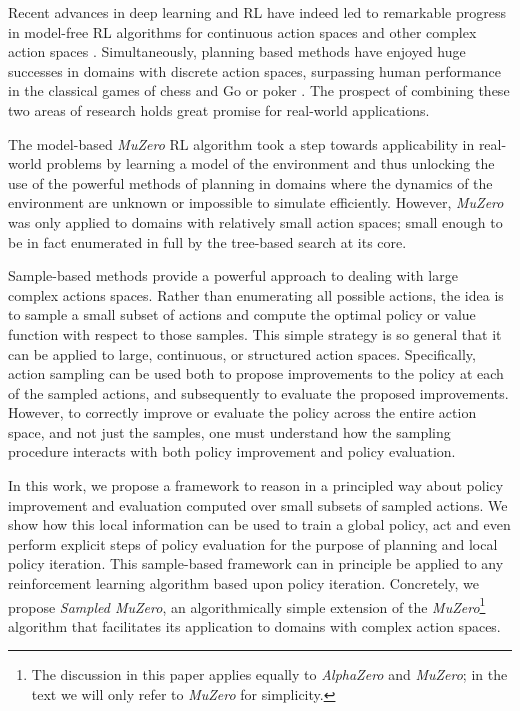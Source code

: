 \documentclass{article}
\newcommand{\alphazero}{\emph{AlphaZero}}
\newcommand{\muzero}{\emph{MuZero}}
\newcommand{\smuzero}{\emph{Sampled MuZero}}
\begin{document}
Recent advances in deep learning and RL have indeed led to remarkable progress in model-free RL algorithms for continuous action spaces \cite{lillicrap2015continuous,schulman2017proximal,d4pg,mpo,hoffman2020acme} and other complex action spaces \cite{dulacarnold2016deep}. Simultaneously, planning based methods have enjoyed huge successes in domains with discrete action spaces, surpassing human performance in the classical games of chess and Go \cite{Silver18AZ} or poker \cite{brown2018superhuman,deepstack}. The prospect of combining these two areas of research holds great promise for real-world applications.

The model-based \muzero{} \cite{muzero} RL algorithm took a step towards applicability in real-world problems by learning a model of the environment and thus unlocking the use of the powerful methods of planning in domains where the dynamics of the environment are unknown or impossible to simulate efficiently. However, \muzero{} was only applied to domains with relatively small action spaces; small enough to be in fact enumerated in full by the tree-based search at its core.

Sample-based methods provide a powerful approach to dealing with large complex actions spaces. Rather than enumerating all possible actions, the idea is to sample a small subset of actions and compute the optimal policy or value function with respect to those samples. This simple strategy is so general that it can be applied to large, continuous, or structured action spaces. Specifically, action sampling can be used both to propose improvements to the policy at each of the sampled actions, and subsequently to evaluate the proposed improvements. However, to correctly improve or evaluate the policy across the entire action space, and not just the samples, one must understand how the sampling procedure interacts with both policy improvement and policy evaluation.

In this work, we propose a framework to reason in a principled way about policy improvement and evaluation computed over small subsets of sampled actions. We show how this local information can be used to train a global policy, act and even perform explicit steps of policy evaluation for the purpose of planning and local policy iteration. This sample-based framework can in principle be applied to any reinforcement learning algorithm based upon policy iteration. Concretely, we propose \smuzero{}, an algorithmically simple extension of the \muzero{}\footnote{The discussion in this paper applies equally to \alphazero{} and \muzero{}; in the text we will only refer to \muzero{} for simplicity.} algorithm that facilitates its application to domains with complex action spaces.
\end{document}
